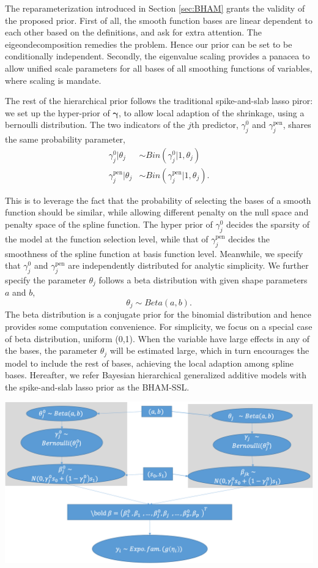 \documentclass[AMA,STIX1COL,]{WileyNJD-v2}
\begin{document}
The reparameterization introduced in Section \ref{sec:BHAM} grants the
validity of the proposed prior. First of all, the smooth function bases
are linear dependent to each other based on the definitions, and ask for
extra attention. The eigeondecomposition remedies the problem. Hence our
prior can be set to be conditionally independent. Secondly, the
eigenvalue scaling provides a panacea to allow unified scale parameters
for all bases of all smoothing functions of variables, where scaling is
mandate.

The rest of the hierarchical prior follows the traditional
spike-and-slab lasso piror: we set up the hyper-prior of
\(\boldsymbol{\gamma}\), to allow local adaption of the shrinkage, using
a bernoulli distribution. The two indicators of the \(j\)th predictor,
\(\gamma^{0}_j\) and \(\gamma^\text{pen}_j\), shares the same
probability parameter, \[
\begin{aligned}
\gamma_{j}^{0} | \theta_j &\sim Bin(\gamma^{0}_{j}|1, \theta_j)\\
\gamma_{j}^\text{pen}| \theta_j &\sim Bin(\gamma^\text{pen}_{j}|1, \theta_j).
\end{aligned}
\]

This is to leverage the fact that the probability of selecting the bases
of a smooth function should be similar, while allowing different penalty
on the null space and penalty space of the spline function. The hyper
prior of \(\gamma_{j}^{0}\) decides the sparsity of the model at the
function selection level, while that of \(\gamma_{j}^\text{pen}\)
decides the smoothness of the spline function at basis function level.
Meanwhile, we specify that \(\gamma_{j}^0\) and
\(\gamma_{j}^\text{pen}\) are independently distributed for analytic
simplicity. We further specify the parameter \(\theta_j\) follows a beta
distribution with given shape parameters \(a\) and \(b\), \[
\theta_j \sim Beta(a, b).
\] The beta distribution is a conjugate prior for the binomial
distribution and hence provides some computation convenience. For
simplicity, we focus on a special case of beta distribution, uniform
(0,1). When the variable have large effects in any of the bases, the
parameter \(\theta_j\) will be estimated large, which in turn encourages
the model to include the rest of bases, achieving the local adaption
among spline bases. Hereafter, we refer Bayesian hierarchical
generalized additive models with the spike-and-slab lasso prior as the
BHAM-SSL.

\includegraphics{Fig/SS_prior_flow_chart.png}
\end{document}
